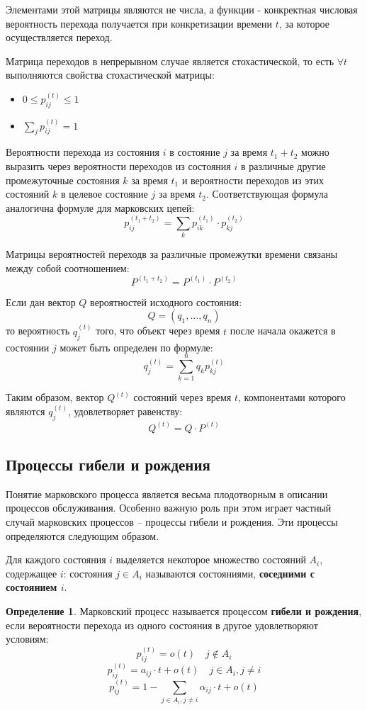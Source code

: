 \documentclass[aps,%
12pt,%
final,%
oneside,
onecolumn,%
musixtex, %
superscriptaddress,%
centertags]{article} %
\theoremstyle{plain}
\theoremstyle{definition}
\newtheorem{definition}{Определение}[subsection]
\theoremstyle{remark}
\begin{document}
Элементами этой матрицы являются не числа, а функции - конкректная числовая вероятность перехода получается при конкретизации времени $t$, за которое осуществляется переход.

Матрица переходов в непрерывном случае является стохастической, то есть $\forall t$ выполняются свойства стохастической матрицы:
\begin{itemize}
	\item $0\leq p_{ij}^{(t)} \leq 1$
	\item $\sum\limits_j p_{ij}^{(t)} = 1$
\end{itemize}

Вероятности перехода из состояния $i$ в состояние $j$ за время $t_1 + t_2$ можно выразить через вероятности переходов из состояния $i$ в различные другие промежуточные состояния $k$ за время $t_1$ и вероятности переходов из этих состояний $k$ в целевое состояние $j$ за время $t_2$. Соответствующая формула аналогична формуле для марковских цепей:
$$p_{ij}^{(t_1+t_2)} = \sum\limits_{k}p_{ik}^{(t_1)} \cdot p_{kj}^{(t_2)}$$

Матрицы вероятностей переходв за различные промежутки времени связаны между собой соотношением:
$$P^{(t_1+t_2)} = P^{(t_1)} \cdot P^{(t_2)}$$

Если дан вектор $Q$ вероятностей исходного состояния:
$$Q = (q_1,\ldots,q_n)$$
то вероятность $q_j^{(t)}$ того, что объект через время $t$ после начала окажется в состоянии $j$ может быть определен по формуле:
$$q_j^{(t)} = \sum\limits_{k=1}^n q_kp_{kj}^{(t)}$$

Таким образом, вектор $Q^{(t)}$ состояний через время $t$, компонентами которого являются $q_j^{(t)}$, удовлетворяет равенству:
$$Q^{(t)} = Q \cdot P^{(t)}$$

\newpage
\subsection{Процессы гибели и рождения}

Понятие марковского процесса является весьма плодотворным в
описании процессов обслуживания. Особенно важную роль при этом
играет частный случай марковских процессов – процессы гибели и
рождения. Эти процессы определяются следующим образом.

Для каждого состояния $i$ выделяется некоторое множество состояний $A_i$, содержащее $i$: состояния $j \in A_i$ называются состояниями, \textbf{соседними с состоянием $i$}.

\begin{definition}
	Марковский процесс называется процессом \textbf{гибели и рождения}, если вероятности перехода из одного состояния в другое удовлетворяют условиям:
	$$p_{ij}^{(t)} = o(t) \quad j \not \in A_i$$
	$$p_{ij}^{(t)} = a_{ij} \cdot t + o(t) \quad j \in A_i, j \neq i$$
	$$p_{ij}^{(t)} = 1- \sum\limits_{j \in A_i, j \neq i} \alpha_{ij} \cdot t + o(t)$$
\end{definition}
\end{document}
